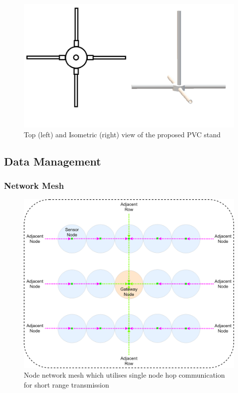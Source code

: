 \documentclass[10pt,twocolumn]{witseiepaper}
\begin{document}
		\begin{figure}
			\centering
			\includegraphics[width=1\columnwidth]{media/topIsoStand.png}
			\caption{Top (left) and Isometric (right) view of the proposed PVC stand}
			\raggedright
			\label{fig:stand}
		\end{figure}
	
	\subsection{Data Management}
		\subsubsection{Network Mesh}
			\begin{figure}
				\centering
				\includegraphics[width=1\columnwidth]{media/hop-mesh.png}
				\vspace{1em}
				\caption{Node network mesh which utilises single node hop communication for short range transmission}
				\raggedright
				\label{fig:single}
			\end{figure}
		
\end{document}
